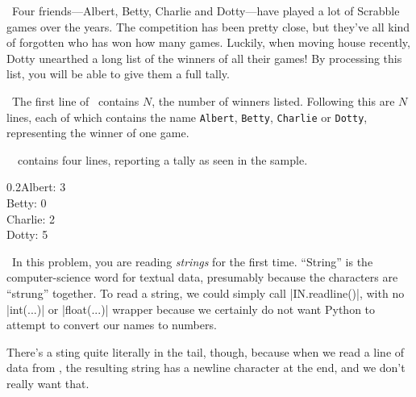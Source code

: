 

\Question\ Four friends---Albert, Betty, Charlie and Dotty---have played a lot of Scrabble
games over the years. The competition has been pretty close, but they've all kind of
forgotten who has won how many games. Luckily, when moving house recently, Dotty unearthed
a long list of the winners of all their games! By processing this list, you will be able
to give them a full tally.

\Input\ The first line of \IN\ contains $N$, the number of winners listed. Following this
are $N$ lines, each of which contains the name \texttt{Albert}, \texttt{Betty},
\texttt{Charlie} or \texttt{Dotty}, representing the winner of one game.

\Output\ \OUT\ contains four lines, reporting a tally as seen in the sample.

\Sample

       {0.2}{Albert: 3\\Betty: 0\\Charlie: 2\\Dotty: 5}

\Scratch\ In this problem, you are reading \emph{strings} for the first time. ``String''
is the computer-science word for textual data, presumably because the characters are
``strung'' together. To read a string, we could simply call \pycode|IN.readline()|, with
no \pycode|int(...)| or \pycode|float(...)| wrapper because we certainly do not want
Python to attempt to convert our names to numbers.

There's a sting quite literally in the tail, though, because when we read a line of data
from \IN, the resulting string has a newline character at the end, and we don't really
want that.

